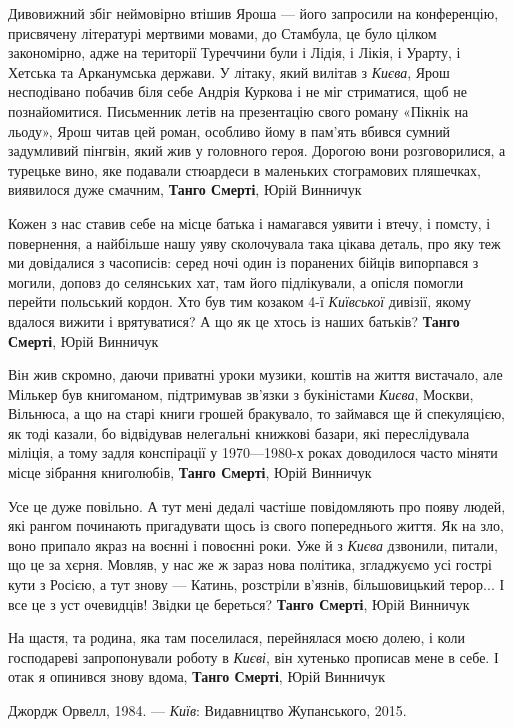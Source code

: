 Дивовижний збіг неймовірно втішив Яроша — його запросили на конференцію,
присвячену літературі мертвими мовами, до Стамбула, це було цілком закономірно,
адже на території Туреччини були і Лідія, і Лікія, і Урарту, і Хетська та
Арканумська держави. У літаку, який вилітав з \emph{Києва}, Ярош несподівано
побачив біля себе Андрія Куркова і не міг стриматися, щоб не познайомитися.
Письменник летів на презентацію свого роману «Пікнік на льоду», Ярош читав цей
роман, особливо йому в пам'ять вбився сумний задумливий пінгвін, який жив у
головного героя. Дорогою вони розговорилися, а турецьке вино, яке подавали
стюардеси в маленьких стограмових пляшечках, виявилося дуже смачним,
\textbf{Танго Смерті}, Юрій Винничук 

Кожен з нас ставив себе на місце батька і намагався уявити і втечу, і помсту, і
повернення, а найбільше нашу уяву сколочувала така цікава деталь, про яку теж
ми довідалися з часописів: серед ночі один із поранених бійців випорпався з
могили, доповз до селянських хат, там його підлікували, а опісля помогли
перейти польський кордон. Хто був тим козаком 4-ї \emph{Київської} дивізії,
якому вдалося вижити і врятуватися? А що як це хтось із наших батьків?
\textbf{Танго Смерті}, Юрій Винничук

Він жив скромно, даючи приватні уроки музики, коштів на життя вистачало, але
Мількер був книгоманом, підтримував зв'язки з букіністами \emph{Києва}, Москви,
Вільнюса, а що на старі книги грошей бракувало, то займався ще й спекуляцією,
як тоді казали, бо відвідував нелегальні книжкові базари, які переслідувала
міліція, а тому задля конспірації у 1970—1980-х роках доводилося часто міняти
місце зібрання книголюбів, \textbf{Танго Смерті}, Юрій Винничук

Усе це дуже повільно. А тут мені дедалі частіше повідомляють про появу людей,
які рангом починають пригадувати щось із свого попереднього життя. Як на зло,
воно припало якраз на воєнні і повоєнні роки. Уже й з \emph{Києва} дзвонили,
питали, що це за хєрня. Мовляв, у нас же ж зараз нова політика, згладжуємо усі
гострі кути з Росією, а тут знову — Катинь, розстріли в'язнів, більшовицький
терор...  І все це з уст очевидців! Звідки це береться?  \textbf{Танго Смерті},
Юрій Винничук

На щастя, та родина, яка там поселилася, перейнялася моєю долею, і коли
господареві запропонували роботу в \emph{Києві}, він хутенько прописав мене в себе. І
отак я опинився знову вдома, \textbf{Танго Смерті}, Юрій Винничук

Джордж Орвелл, 1984. — \emph{Київ}: Видавництво Жупанського, 2015.

